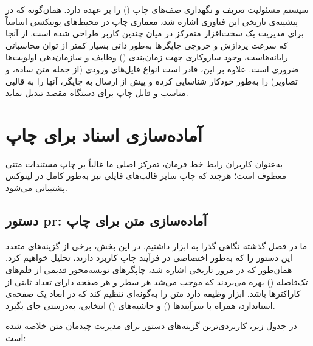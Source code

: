 سیستم  مسئولیت تعریف و نگهداری صف‌های چاپ () را بر عهده دارد. همان‌گونه که در پیشینه‌ی تاریخی این فناوری اشاره شد، معماری چاپ در محیط‌های یونیکسی اساساً برای مدیریت یک سخت‌افزار متمرکز در میان چندین کاربر طراحی شده است. از آنجا که سرعت پردازش و خروجی چاپگرها به‌طور ذاتی بسیار کمتر از توان محاسباتی رایانه‌هاست، وجود سازوکاری جهت زمان‌بندی () وظایف و سازمان‌دهی اولویت‌ها ضروری است. علاوه بر این،  قادر است انواع فایل‌های ورودی (از جمله متن ساده،  و تصاویر) را به‌طور خودکار شناسایی کرده و پیش از ارسال به چاپگر، آنها را به قالبی مناسب و قابل چاپ برای دستگاه مقصد تبدیل نماید.

\section{آماده‌سازی اسناد برای چاپ}

به‌عنوان کاربران رابط خط فرمان، تمرکز اصلی ما غالباً بر چاپ مستندات متنی معطوف است؛ هرچند که چاپ سایر قالب‌های فایلی نیز به‌طور کامل در لینوکس پشتیبانی می‌شود.

\subsection{دستور pr: آماده‌سازی متن برای چاپ}

ما در فصل گذشته نگاهی گذرا به ابزار  داشتیم. در این بخش، برخی از گزینه‌های متعدد این دستور را که به‌طور اختصاصی در فرآیند چاپ کاربرد دارند، تحلیل خواهیم کرد. همان‌طور که در مرور تاریخی اشاره شد، چاپگرهای نویسه‌محور قدیمی از قلم‌های تک‌فاصله () بهره می‌بردند که موجب می‌شد هر سطر و هر صفحه دارای تعداد ثابتی از کاراکترها باشد. ابزار  وظیفه دارد متن را به‌گونه‌ای تنظیم کند که در ابعاد یک صفحه‌ی استاندارد، همراه با سرآیند‌ها () و حاشیه‌های () انتخابی، به‌درستی جای بگیرد.

در جدول زیر، کاربردی‌ترین گزینه‌های دستور  برای مدیریت چیدمان متن خلاصه شده است:

